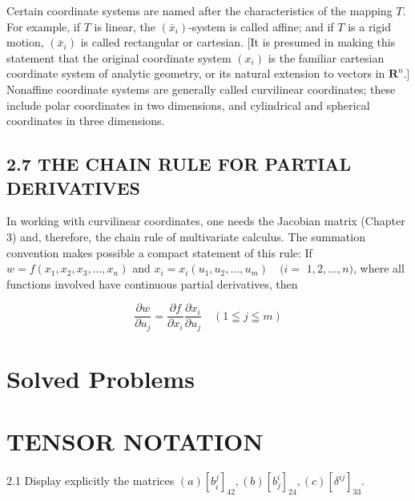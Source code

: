 \documentclass[10pt]{article}
\begin{document}
Certain coordinate systems are named after the characteristics of the mapping $T$. For example, if $T$ is linear, the $\left(\bar{x}_{i}\right)$-system is called affine; and if $T$ is a rigid motion, $\left(\bar{x}_{i}\right)$ is called rectangular or cartesian. [It is presumed in making this statement that the original coordinate system $\left(x_{i}\right)$ is the familiar cartesian coordinate system of analytic geometry, or its natural extension to vectors in $\mathbf{R}^{n}$.] Nonaffine coordinate systems are generally called curvilinear coordinates; these include polar coordinates in two dimensions, and cylindrical and spherical coordinates in three dimensions.

\subsection*{2.7 THE CHAIN RULE FOR PARTIAL DERIVATIVES}
In working with curvilinear coordinates, one needs the Jacobian matrix (Chapter 3) and, therefore, the chain rule of multivariate calculus. The summation convention makes possible a compact statement of this rule: If $w=f\left(x_{1}, x_{2}, x_{3}, \ldots, x_{n}\right)$ and $x_{i}=x_{i}\left(u_{1}, u_{2}, \ldots, u_{m}\right) \quad(i=$ $1,2, \ldots, n)$, where all functions involved have continuous partial derivatives, then


\begin{equation*}
\frac{\partial w}{\partial u_{j}}=\frac{\partial f}{\partial x_{i}} \frac{\partial x_{i}}{\partial u_{j}} \quad(1 \leqq j \leqq m) \tag{2.15}
\end{equation*}


\section*{Solved Problems}
\section*{TENSOR NOTATION}
2.1 Display explicitly the matrices $(a)\left[b_{i}^{j}\right]_{42},(b)\left[b_{j}^{i}\right]_{24},(c)\left[\delta^{i j}\right]_{33}$.
\end{document}
